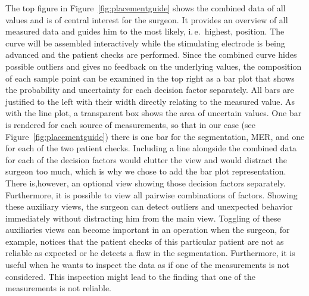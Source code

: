 \documentclass[review]{vgtc}                 %
\begin{document}
The top figure in Figure~\ref{fig:placementguide} shows the combined data of all values and is of central interest for the surgeon. It provides an overview of all measured data and guides him to the most likely, i.\,e.~highest, position. The curve will be assembled interactively while the stimulating electrode is being advanced and the patient checks are performed. Since the combined curve hides possible outliers and gives no feedback on the underlying values, the composition of each sample point can be examined in the top right as a bar plot that shows the probability and uncertainty for each decision factor separately. All bars are justified to the left with their width directly relating to the measured value. As with the line plot, a transparent box shows the area of uncertain values. One bar is rendered for each source of measurements, so that in our case (see Figure~\ref{fig:placementguide}) there is one bar for the segmentation, MER, and one for each of the two patient checks. Including a line alongside the combined data for each of the decision factors would clutter the view and would distract the surgeon too much, which is why we chose to add the bar plot representation. There is,however, an optional view showing those decision factors separately. Furthermore, it is possible to view all pairwise combinations of factors. Showing these auxiliary views, the surgeon can detect outliers and unexpected behavior immediately without distracting him from the main view. Toggling of these auxiliaries views can become important in an operation when the surgeon, for example, notices that the patient checks of this particular patient are not as reliable as expected or he detects a flaw in the segmentation. Furthermore, it is useful when he wants to inspect the data as if one of the measurements is not considered. This inspection might lead to the finding that one of the measurements is not reliable.

\end{document}
